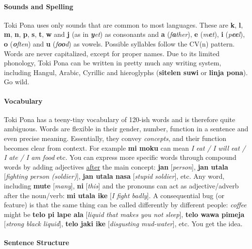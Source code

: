 \documentclass[10pt,a4paper]{article}
\begin{document}
\begin{multicols}{2}
\paragraph{Sounds and Spelling}

Toki Pona uses only sounds that are common to most languages. These are \textbf{k}, \textbf{l}, \textbf{m}, \textbf{n}, \textbf{p}, \textbf{s}, \textbf{t}, \textbf{w} and \textbf{j} (as in \textit{\textbf{y}et}) as consonants and \textbf{a} (\textit{f\textbf{a}ther}), \textbf{e} (\textit{m\textbf{e}t}), \textbf{i} (\textit{p\textbf{ee}l}), \textbf{o} (\textit{\textbf{o}ften}) and \textbf{u} (\textit{f\textbf{oo}d}) as vowels. Possible syllables follow the CV(n) pattern. Words are never capitalized, except for proper names. Due to its limited phonology, Toki Pona can be written in pretty much any writing system, including Hangul, Arabic, Cyrillic and hieroglyphs (\textbf{sitelen suwi} or \textbf{linja pona}). Go wild.

\paragraph{Vocabulary}

Toki Pona has a teeny-tiny vocabulary of 120-ish words and is therefore quite ambiguous. Words are flexible in their gender, number, function in a sentence and even precise meaning.  Essentially, they convey \textit{concepts}, and their function becomes clear from context. For example \textbf{mi moku} can mean \textit{I eat / I will eat / I ate / I am food} etc. You can express more specific words through compound words by adding adjectives \underline{after} the main concept: \textbf{jan} [\textit{person}], \textbf{jan utala} [\textit{fighting person (soldier)}], \textbf{jan utala nasa} [\textit{stupid soldier}], etc. Any word, including \textbf{mute} [\textit{many}], \textbf{ni} [\textit{this}] and the pronouns can act as adjective/adverb after the noun/verb: \textbf{mi utala ike} [\textit{I fight badly}]. A consequential bug (or feature) is that the same thing can be called differently by different people: \textit{coffee} might be \textbf{telo pi lape ala} [\textit{liquid that makes you not sleep}], \textbf{telo wawa pimeja} [\textit{strong black liquid}], \textbf{telo jaki ike} [\textit{disgusting mud-water}], etc. You get the idea.

\paragraph{Sentence Structure}


\end{multicols}
\end{document}
